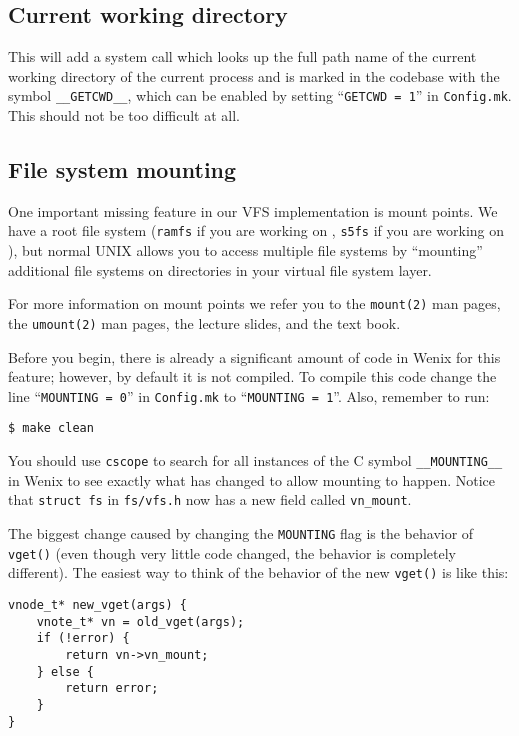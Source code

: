 \subsection{Current working directory}
This will add a system call which looks up the full path name of the current working directory of the current process and is marked in the codebase with the symbol \texttt{\_\_GETCWD\_\_}, which can be enabled by setting ``\texttt{GETCWD = 1}'' in \texttt{Config.mk}. This should not be too difficult at all.

\subsection{File system mounting}
One important missing feature in our VFS implementation is mount points. We have a root file system (\texttt{ramfs} if you are working on , \texttt{s5fs} if you are working on ), but normal UNIX allows you to access multiple file systems by ``mounting'' additional file systems on directories in your virtual file system layer.

For more information on mount points we refer you to the \texttt{mount(2)} man pages, the \texttt{umount(2)} man pages, the lecture slides, and the text book.

Before you begin, there is already a significant amount of code in Wenix for this feature; however, by default it is not compiled. To compile this code change the line ``\texttt{MOUNTING = 0}'' in \texttt{Config.mk} to ``\texttt{MOUNTING = 1}''. Also, remember to run:
\begin{verbatim}
$ make clean\end{verbatim}

You should use \texttt{cscope} to search for all instances of the C symbol \texttt{\_\_MOUNTING\_\_} in Wenix to see exactly what has changed to allow mounting to happen. Notice that \texttt{struct fs} in \texttt{fs/vfs.h} now has a new field called \texttt{vn\_mount}.

The biggest change caused by changing the \texttt{MOUNTING} flag is the behavior of \texttt{vget()} (even though very little code changed, the behavior is completely different). The easiest way to think of the behavior of the new \texttt{vget()} is like this:
\begin{verbatim}
vnode_t* new_vget(args) {
    vnote_t* vn = old_vget(args);
    if (!error) {
        return vn->vn_mount;
    } else {
        return error;
    }
}\end{verbatim}

